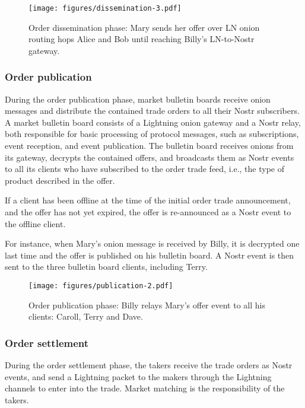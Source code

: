 \documentclass[pdflatex,sn-mathphys]{sn-jnl}%
\theoremstyle{thmstyleone}%
\theoremstyle{thmstyletwo}%
\theoremstyle{thmstylethree}%
\begin{document}
\begin{figure}[h]
    \centering
    \texttt{[image: figures/dissemination-3.pdf]}
    \caption{Order dissemination phase: Mary sends her offer over LN onion routing hops Alice and Bob until reaching Billy's LN-to-Nostr gateway.}
    \label{fig:dissemination}
\end{figure}

\subsubsection{Order publication}

During the order publication phase, market bulletin boards receive onion messages and distribute the contained trade orders to all their Nostr subscribers. A market bulletin board consists of a Lightning onion gateway and a Nostr relay, both responsible for basic processing of protocol messages, such as subscriptions, event reception, and event publication. The bulletin board receives onions from its gateway, decrypts the contained offers, and broadcasts them as Nostr events to all its clients who have subscribed to the order trade feed, i.e., the type of product described in the offer.

If a client has been offline at the time of the initial order trade announcement, and the offer has not yet expired, the offer is re-announced as a Nostr event to the offline client.

For instance, when Mary’s onion message is received by Billy, it is decrypted one last time and the offer is published on his bulletin board. A Nostr event is then sent to the three bulletin board clients, including Terry.

\begin{figure}[h]
    \centering
    \texttt{[image: figures/publication-2.pdf]}
    \caption{Order publication phase: Billy relays Mary's offer event to all his clients: Caroll, Terry and Dave.}
    \label{fig:publication}
\end{figure}

\subsubsection{Order settlement}

During the order settlement phase, the takers receive the trade orders as Nostr events, and send a Lightning packet to the makers through the Lightning channels to enter into the trade. Market matching is the responsibility of the takers.
\end{document}
